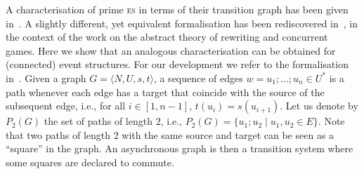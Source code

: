 \documentclass[conference]{IEEEtran}
\newcommand{\esabbr}{\textsc{es}}
\newcommand{\interval}[2][1]{\ensuremath{[{#1},{#2}]}}
\begin{document}
A characterisation  of prime {\esabbr} in terms of their transition
graph has been given in~\cite{PU:RMC}. A slightly different, yet
equivalent formalisation has been rediscovered in~\cite{Mel:hab}, in the
context of the work on the abstract theory of rewriting and concurrent
games.
%
Here we show that an analogous characterisation can be obtained for (connected)
event structures. For our development we refer to the formalisation in~\cite{Mel:hab}.
%
Given a graph $G = \langle N, U, s, t \rangle$, a sequence of edges
$w = u_1; \ldots; u_n \in U^*$ is a path whenever each edge has a
target that coincide with the source of the subsequent edge, i.e., for
all $i \in \interval{n-1}$, $t(u_i) = s(u_{i+1})$.
%
Let us denote by $P_2(G)$ the set of paths of length $2$, i.e.,
$P_2(G) = \{ u_1; u_2 \mid u_1, u_2 \in E \}$. Note that two paths of
length 2 with the same source and target can be seen as a ``square''
in the graph. An asynchronous graph is then a transition system where
some squares are declared to commute.
\end{document}
